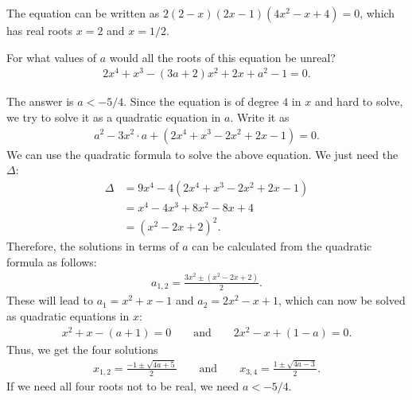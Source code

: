 \begin{solution}[name=Solution by Parviz Shahriari]
The equation can be written as $2(2-x)(2x-1)(4x^2-x+4)=0$, which has real roots $x=2$ and  $x=1/2$.
\end{solution}




\begin{tcolorbox}
\begin{question}
For what values of $a$ would all the roots of this equation be unreal?
\begin{align*}
    2x^4 + x^3 - (3a+2)x^2 + 2x + a^2 -1 = 0.
\end{align*}
\end{question}
\end{tcolorbox}

\begin{solution}[name=Solution by Parviz Shahriari]
The answer is $a<-5/4$. Since the equation is of degree $4$ in $x$ and hard to solve, we try to solve it as a quadratic equation in $a$. Write it as
\begin{align*}
    a^2 - 3x^2 \cdot a + (2x^4 +x^3-2x^2+2x-1)=0.
\end{align*}
We can use the quadratic formula to solve the above equation. We just need the $\Delta$:
\begin{align*}
    \Delta &= 9x^4 -4(2x^4 +x^3-2x^2+2x-1) \\
           &= x^4 - 4x^3 + 8x^2 - 8x + 4\\
           &= (x^2-2x+2)^2.
\end{align*}
Therefore, the solutions in terms of $a$ can be calculated from the quadratic formula as follows:
\begin{align*}
    a_{1,2} = \frac{3x^2 \pm (x^2 - 2x + 2)}{2}.
\end{align*}
These will lead to $a_1=x^2+x-1$ and $a_2=2x^2-x+1$, which can now be solved as quadratic equations in $x$:
\begin{align*}
    x^2 + x - (a+1) = 0 \qquad \text{and} \qquad 2x^2 - x + (1-a)=0.
\end{align*}
Thus, we get the four solutions
\begin{align*}
    x_{1,2} = \frac{-1 \pm \sqrt{4a+5}}{2} \qquad \text{and} \qquad x_{3,4} = \frac{1 \pm \sqrt{4a-3}}{2}.
\end{align*}
If we need all four roots not to be real, we need $a<-5/4$.
\end{solution}




